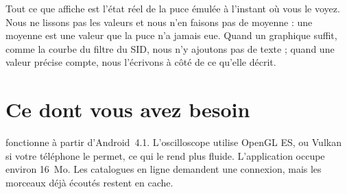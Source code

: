 Tout ce que \soft affiche est l'état réel de la puce émulée à l'instant où vous le voyez. Nous ne lissons pas les
valeurs et nous n'en faisons pas de moyenne : une moyenne est une valeur que la puce n'a jamais eue. Quand un
graphique suffit, comme la courbe du filtre du SID, nous n'y ajoutons pas de texte ; quand une valeur précise
compte, nous l'écrivons à côté de ce qu'elle décrit.

\section{Ce dont vous avez besoin}
\soft fonctionne à partir d'Android~4.1. L'oscilloscope utilise OpenGL ES, ou Vulkan si votre téléphone le permet,
ce qui le rend plus fluide. L'application occupe environ 16~Mo. Les catalogues en ligne demandent une connexion,
mais les morceaux déjà écoutés restent en cache.

